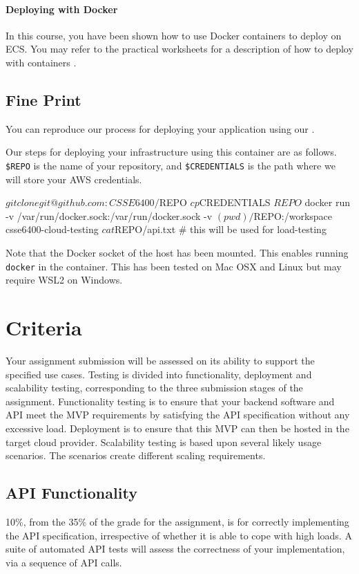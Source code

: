 \documentclass{csse4400}
\begin{document}
\paragraph{Deploying with Docker}
In this course, you have been shown how to use Docker containers to deploy on ECS. You may refer to the practical worksheets for a description of how to deploy with containers \cite{prac-week5}.

\subsection{Fine Print}
You can reproduce our process for deploying your application using our
.

Our steps for deploying your infrastructure using this container are as follows.
\texttt{\$REPO} is the name of your repository, and
\texttt{\$CREDENTIALS} is the path where we will store your AWS credentials.
\begin{code}[language=shell]{}
$ git clone git@github.com:CSSE6400/$REPO
$ cp $CREDENTIALS $REPO
$ docker run -v /var/run/docker.sock:/var/run/docker.sock -v $(pwd)/$REPO:/workspace csse6400-cloud-testing
$ cat $REPO/api.txt # this will be used for load-testing
\end{code}

Note that the Docker socket of the host has been mounted. This enables running \texttt{docker} in the container. This has been tested on Mac OSX and Linux but may require WSL2 on Windows.


\section{Criteria}
Your assignment submission will be assessed on its ability to support the specified use cases.
Testing is divided into functionality, deployment and scalability testing,
corresponding to the three submission stages of the assignment.
Functionality testing is to ensure that your backend software and API
meet the MVP requirements by satisfying the API specification without any excessive load.
Deployment is to ensure that this MVP can then be hosted in the target cloud provider.
Scalability testing is based upon several likely usage scenarios.
The scenarios create different scaling requirements.

\subsection{API Functionality} %
10\%, from the 35\% of the grade for the assignment, is for correctly implementing the API specification,
irrespective of whether it is able to cope with high loads.
A suite of automated API tests will assess the correctness of your implementation, via a sequence of API calls.
\end{document}
